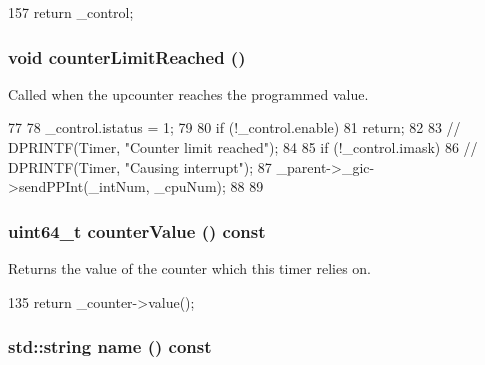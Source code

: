 \begin{DoxyCode}
157 { return _control; }
\end{DoxyCode}
\hypertarget{classGenericTimer_1_1ArchTimer_acc4e0298c1061147051688ef6dd627de}{
\subsubsection[{counterLimitReached}]{\setlength{\rightskip}{0pt plus 5cm}void counterLimitReached ()}}
\label{classGenericTimer_1_1ArchTimer_acc4e0298c1061147051688ef6dd627de}


Called when the upcounter reaches the programmed value. 


\begin{DoxyCode}
77 {
78     _control.istatus = 1;
79 
80     if (!_control.enable)
81         return;
82 
83     // DPRINTF(Timer, "Counter limit reached\n");
84 
85     if (!_control.imask) {
86         // DPRINTF(Timer, "Causing interrupt\n");
87         _parent->_gic->sendPPInt(_intNum, _cpuNum);
88     }
89 }
\end{DoxyCode}
\hypertarget{classGenericTimer_1_1ArchTimer_afeb6e6524af1f7d73d5233438369a5ae}{
\subsubsection[{counterValue}]{\setlength{\rightskip}{0pt plus 5cm}uint64\_\-t counterValue () const}}
\label{classGenericTimer_1_1ArchTimer_afeb6e6524af1f7d73d5233438369a5ae}


Returns the value of the counter which this timer relies on. 


\begin{DoxyCode}
135 { return _counter->value(); }
\end{DoxyCode}
\hypertarget{classGenericTimer_1_1ArchTimer_a37627d5d5bba7f4a8690c71c2ab3cb07}{
\subsubsection[{name}]{\setlength{\rightskip}{0pt plus 5cm}std::string name () const}}
\label{classGenericTimer_1_1ArchTimer_a37627d5d5bba7f4a8690c71c2ab3cb07}


